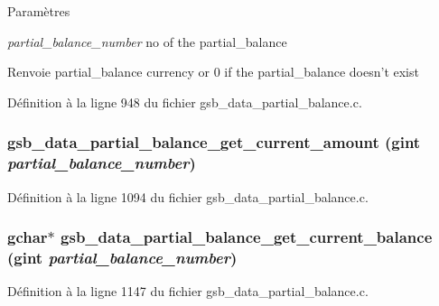 \begin{DoxyParams}{Paramètres}
\item[{\em partial\_\-balance\_\-number}]no of the partial\_\-balance\end{DoxyParams}
\begin{DoxyReturn}{Renvoie}
partial\_\-balance currency or 0 if the partial\_\-balance doesn't exist 
\end{DoxyReturn}


Définition à la ligne 948 du fichier gsb\_\-data\_\-partial\_\-balance.c.

\subsubsection[{gsb\_\-data\_\-partial\_\-balance\_\-get\_\-current\_\-amount}]{ gsb\_\-data\_\-partial\_\-balance\_\-get\_\-current\_\-amount (gint {\em partial\_\-balance\_\-number})}\label{gsb__data__partial__balance_8c_a3b93643dcaf37d9037bd7c62d244a0d1}


Définition à la ligne 1094 du fichier gsb\_\-data\_\-partial\_\-balance.c.

\subsubsection[{gsb\_\-data\_\-partial\_\-balance\_\-get\_\-current\_\-balance}]{\setlength{\rightskip}{0pt plus 5cm}gchar$\ast$ gsb\_\-data\_\-partial\_\-balance\_\-get\_\-current\_\-balance (gint {\em partial\_\-balance\_\-number})}\label{gsb__data__partial__balance_8c_aa499f52edc2425fcf0ab8c87235e5f33}


Définition à la ligne 1147 du fichier gsb\_\-data\_\-partial\_\-balance.c.

